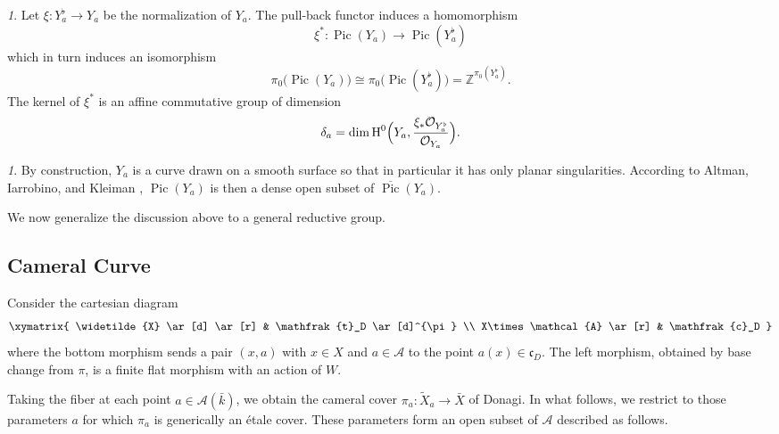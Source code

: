 \documentclass[12pt,english]{smfart}
\numberwithin{equation}{subsection}
\theoremstyle{remark}
\newtheorem{numero}[equation]{}
\begin{document}
\begin{numero}
Let $\xi:Y_a^\flat\rightarrow Y_a$ be the normalization of $Y_a$. The pull-back functor induces a homomorphism
$$
\xi^*:\operatorname{Pic}(Y_a)\rightarrow \operatorname{Pic}(Y_a^\flat)
$$
which in turn induces an isomorphism
$$
\pi_0\bigl(\operatorname{Pic}(Y_a)\bigr)\cong \pi_0\bigl(\operatorname{Pic}(Y_a^\flat)\bigr)=\mathbb{Z}^{\pi_0(Y_a^\flat)}.
$$
The kernel of $\xi^*$ is an affine commutative group of dimension
$$
\delta_a=\dim \operatorname{H}^0\Bigl(Y_a,\frac{\xi_*\mathcal{O}_{Y_a^\flat}}{\mathcal{O}_{Y_a}}\Bigr).
$$
\end{numero}

\begin{numero}
By construction, $Y_a$ is a curve drawn on a smooth surface so that in particular it has only planar singularities.
According to Altman, Iarrobino, and Kleiman \cite{AIK}, $\operatorname{Pic}(Y_a)$ is then a dense open subset of $\overline{\operatorname{Pic}}(Y_a)$.
\end{numero}

We now generalize the discussion above to a general reductive group.

\subsection{Cameral Curve}\label{subsection : courbe camerale}

Consider the cartesian diagram
$$
\xymatrix{
\widetilde{X} \ar[d] \ar[r] & \mathfrak{t}_D \ar[d]^{\pi} \\
X\times \mathcal{A} \ar[r] & \mathfrak{c}_D
}
$$
where the bottom morphism sends a pair $(x,a)$ with $x\in X$ and $a\in\mathcal{A}$ to the point $a(x)\in \mathfrak{c}_D$.
The left morphism, obtained by base change from $\pi$, is a finite flat morphism with an action of $W$.

Taking the fiber at each point $a\in\mathcal{A}(\bar{k})$, we obtain the cameral cover $\pi_a:\widetilde{X}_a\rightarrow \bar X$ of Donagi.
In what follows, we restrict to those parameters $a$ for which $\pi_a$ is generically an
\'etale cover. These parameters form an open subset of $\mathcal{A}$ described as follows.
\end{document}
